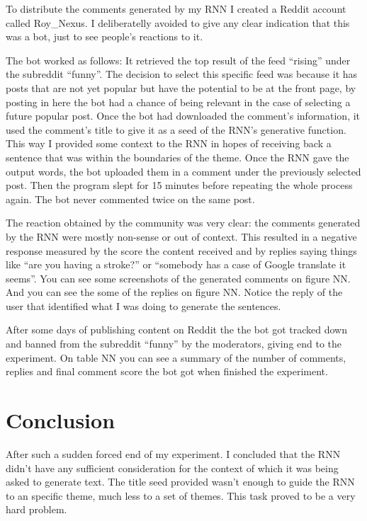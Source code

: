 \documentclass{article} %
\begin{document}

To distribute the comments generated by my RNN I created a Reddit account called
Roy\_Nexus. I deliberatelly avoided to give any clear indication that this was
a bot, just to see people's reactions to it.

The bot worked as follows: It retrieved the top result of the feed ``rising''
under the subreddit ``funny''.  The decision to select this specific feed was
because it has posts that are not yet popular but have the potential to be at
the front page, by posting in here the bot had a chance of being relevant in the
case of selecting a future popular post. Once the bot had downloaded the
comment's information, it used the comment's title to give it as a seed of the
RNN's generative function. This way I provided some context to the RNN in hopes
of receiving back a sentence that was within the boundaries of the theme. Once
the RNN gave the output words, the bot uploaded them in a comment under the
previously selected post. Then the program slept for 15 minutes before repeating
the whole process again. The bot never commented twice on the same post.

The reaction obtained by the community was very clear: the comments generated by
the RNN were mostly non-sense or out of context. This resulted in a negative
response measured by the score the content received and by replies saying things
like ``are you having a stroke?'' or ``somebody has a case of Google translate
it seems''. You can see some screenshots of the generated comments on figure NN.
And you can see the some of the replies on figure NN. Notice the reply of the
user that identified what I was doing to generate the sentences.


After some days of publishing content on Reddit the the bot got tracked down and
banned from the subreddit ``funny'' by the moderators, giving end to the
experiment. On table NN you can see a summary of the number of comments, replies
and final comment score the bot got when finished the experiment.


\section{Conclusion}
After such a sudden forced end of my experiment. I concluded that the RNN didn't
have any sufficient consideration for the context of which it was being asked to
generate text. The title seed provided wasn't enough to guide the RNN to an
specific theme, much less to a set of themes. This task proved to be a very hard
problem.
\end{document}
